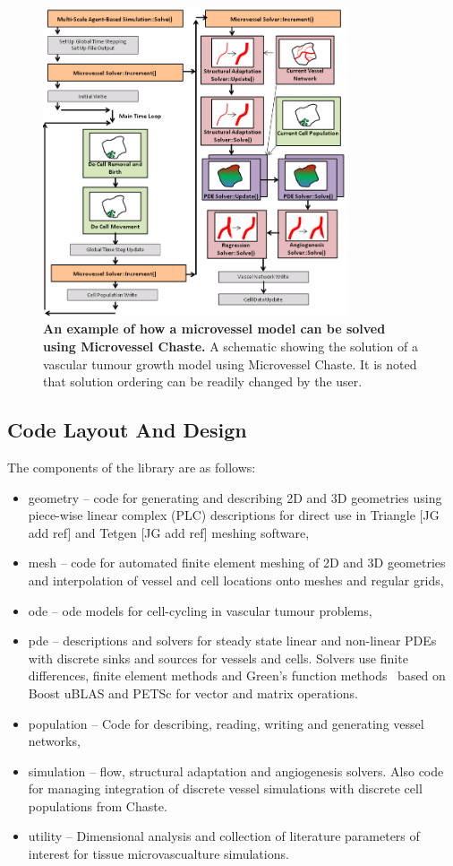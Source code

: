 \documentclass[10pt,letterpaper]{article}
\begin{document}
\begin{figure}[!h]
\centering
\includegraphics[width=0.8\textwidth]{Fig2.png}
\caption{{\bf An example of how a microvessel model can be solved using Microvessel Chaste.}
A schematic showing the solution of a vascular tumour growth model using Microvessel Chaste. It is noted that solution ordering can be readily changed by the user.}
\label{fig2}
\end{figure}

\subsection*{Code Layout And Design}

The components of the library are as follows:

\begin{itemize}
	\item geometry -- code for generating and describing 2D and 3D geometries using piece-wise linear complex (PLC) descriptions for direct use in Triangle [JG add ref] and Tetgen [JG add ref] meshing software,
	\item mesh -- code for automated finite element meshing of 2D and 3D geometries and interpolation of vessel and cell locations onto meshes and regular grids,
	\item ode -- ode models for cell-cycling in vascular tumour problems,
	\item pde -- descriptions and solvers for steady state linear and non-linear PDEs with discrete sinks and sources for vessels and cells. Solvers use finite differences, finite element methods and Green's function methods~\cite{Secomb2013} based on Boost uBLAS and PETSc for vector and matrix operations.
	\item population -- Code for describing, reading, writing and generating vessel networks,
	\item simulation -- flow, structural adaptation and angiogenesis solvers. Also code for managing integration of discrete vessel simulations with discrete cell populations from Chaste.
	\item utility -- Dimensional analysis and collection of literature parameters of interest for tissue microvascualture simulations.	
\end{itemize}
\end{document}
